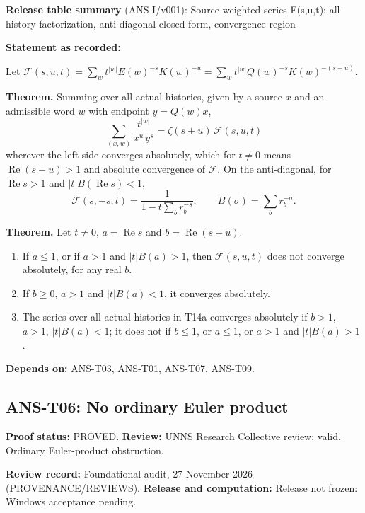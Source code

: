 \documentclass[
  11pt,
]{article}
\providecommand{\tightlist}{%
  \setlength{\itemsep}{0pt}\setlength{\parskip}{0pt}}
\begin{document}
\textbf{Release table summary} (ANS-I/v001): Source-weighted series
F(s,u,t): all-history factorization, anti-diagonal closed form,
convergence region

\textbf{Statement as recorded:}

Let
\(\mathcal F(s,u,t)=\sum_w t^{|w|}E(w)^{-s}K(w)^{-u}=\sum_wt^{|w|}Q(w)^{-s}K(w)^{-(s+u)}\).

\textbf{Theorem.} Summing over all actual histories, given by a source
\(x\) and an admissible word \(w\) with endpoint \(y=Q(w)x\),
\[\sum_{(x,w)}\frac{t^{|w|}}{x^{u}\,y^{s}}=\zeta(s+u)\,\mathcal F(s,u,t)\]
wherever the left side converges absolutely, which for \(t\ne0\) means
\(\operatorname{Re}(s+u)>1\) and absolute convergence of \(\mathcal F\).
On the anti-diagonal, for \(\operatorname{Re}s>1\) and
\(|t|B(\operatorname{Re}s)<1\),
\[\mathcal F(s,-s,t)=\frac1{1-t\sum_b r_b^{-s}},\qquad B(\sigma)=\sum_br_b^{-\sigma}.\]

\textbf{Theorem.} Let \(t\ne0\), \(a=\operatorname{Re}s\) and
\(b=\operatorname{Re}(s+u)\).

\begin{enumerate}
\def\labelenumi{\arabic{enumi}.}
\tightlist
\item
  If \(a\le1\), or if \(a>1\) and \(|t|B(a)>1\), then
  \(\mathcal F(s,u,t)\) does not converge absolutely, for any real
  \(b\).
\item
  If \(b\ge0\), \(a>1\) and \(|t|B(a)<1\), it converges absolutely.
\item
  The series over all actual histories in T14a converges absolutely if
  \(b>1\), \(a>1\), \(|t|B(a)<1\); it does not if \(b\le1\), or
  \(a\le1\), or \(a>1\) and \(|t|B(a)>1\).
\end{enumerate}

\textbf{Depends on:} ANS-T03, ANS-T01, ANS-T07, ANS-T09.

\hypertarget{ans-t06-no-ordinary-euler-product}{%
\subsection{ANS-T06: No ordinary Euler
product}\label{ans-t06-no-ordinary-euler-product}}

\textbf{Proof status:} PROVED. \textbf{Review:} UNNS Research Collective
review: valid. Ordinary Euler-product obstruction.

\textbf{Review record:} Foundational audit, 27 November 2026
(PROVENANCE/REVIEWS). \textbf{Release and computation:} Release not
frozen: Windows acceptance pending.
\end{document}
